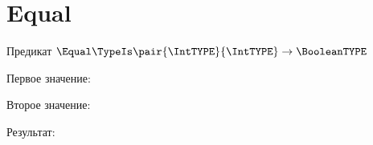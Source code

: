 \section{Equal}
\begin{frame}{Предикат $\Equal\TypeIs\pair{\IntTYPE}{\IntTYPE}\to\BooleanTYPE$}

	Первое значение:


	Второе значение:


	Результат:

\end{frame}
